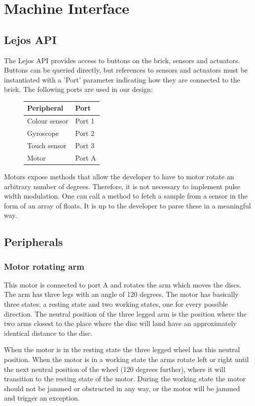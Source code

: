 \documentclass[a4paper,oneside,11pt]{article}
\begin{document}
\section{Machine Interface}
\subsection{Lejos API}
The Lejos API provides access to buttons on the brick, sensors and actuators.
Buttons can be queried directly, but references to sensors and actuators must be instantiated
with a ’Port’ parameter indicating how they are connected to the brick. The following ports
are used in our design:

\begin{figure}[H]
\begin{tabular}{|l|l|}
\hline
\textbf{Peripheral} & \textbf{Port} \\
\hline
Colour sensor & Port 1 \\
Gyroscope & Port 2 \\
Touch sensor & Port 3 \\
Motor & Port A \\
\hline
\end{tabular}
\end{figure}

Motors expose methods that allow the developer to have to motor rotate an arbitrary number of degrees. Therefore, it is not necessary to implement pulse width modulation. One can call a method to fetch a sample from a sensor in the form of an array of floats. It is up to the developer to parse these in a meaningful way.

\subsection{Peripherals}

\subsubsection{Motor rotating arm}
This motor is connected to port A and rotates the arm which moves the discs. The arm has three legs with an angle of 120 degrees. The motor has basically three states: a resting state and two working states, one for every possible direction. The neutral position of the three legged arm is the position where the two arms closest to the place where the disc will land have an approximately identical distance to the disc.

When the motor is in the resting state the three legged wheel has this neutral position. When the motor is in a working state the arms rotate left or right until the next neutral position of the wheel (120 degrees further), where it will transition to the resting state of the motor. During the working state the motor should not be jammed or obstructed in any way, or the motor will be jammed and trigger an exception.
\end{document}
